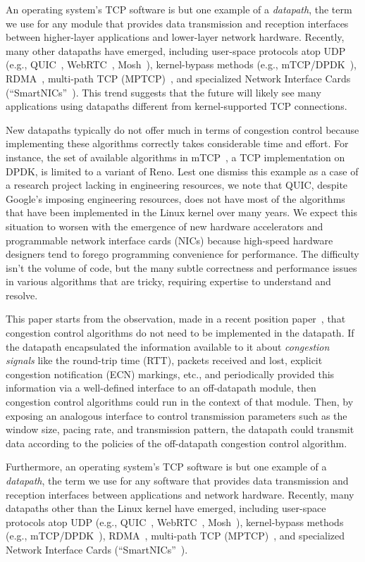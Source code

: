 An operating system's TCP software is but one example of a {\em datapath}, the term we use for any module that provides data transmission and reception interfaces between higher-layer applications and lower-layer network hardware. Recently, many other datapaths have emerged, including user-space protocols atop UDP (e.g., QUIC~\cite{quic}, WebRTC~\cite{webrtc}, Mosh~\cite{mosh}), kernel-bypass methods (e.g., mTCP/DPDK~\cite{dpdk,mtcp,netmap}), RDMA~\cite{dcqcn}, multi-path TCP (MPTCP)~\cite{mptcp}, and specialized Network Interface Cards (``SmartNICs''~\cite{smartnic}). This trend suggests that the future will likely see many applications using datapaths different from kernel-supported TCP connections.

New datapaths typically do not offer much in terms of congestion control because implementing these algorithms correctly takes considerable time and effort. For instance, the set of available algorithms in mTCP~\cite{mtcp}, a TCP implementation on DPDK, is limited to a variant of Reno. Lest one dismiss this example as a case of a research project lacking in engineering resources, we note that QUIC, despite Google's imposing engineering resources, does not have most of the algorithms that have been implemented in the Linux kernel over many years.  We expect this situation to worsen with the emergence of new hardware accelerators and programmable network interface cards (NICs) because high-speed hardware designers tend to forego programming convenience for performance. The difficulty isn't the volume of code, but the many subtle correctness and performance issues in various algorithms that are tricky, requiring expertise to understand and resolve.

This paper starts from the observation, made in a recent position paper~\cite{ccp-hotnets}, that congestion control algorithms do not need to be implemented in the datapath. If the datapath encapsulated the information available to it about {\em congestion signals} like the round-trip time (RTT), packets received and lost, explicit congestion notification (ECN) markings, etc., and periodically provided this information via a well-defined interface to an off-datapath module, then congestion control algorithms could run in the context of that module. Then, by exposing an analogous interface to control transmission parameters such as the window size, pacing rate, and transmission pattern, the datapath could transmit data according to the policies of the off-datapath congestion control algorithm. 

Furthermore, an operating system's TCP software is but one example of a {\em
  datapath}, the term we use for any software that provides data transmission
and reception interfaces between applications and network hardware.
%
Recently, many datapaths other than the Linux kernel have emerged, including
user-space protocols atop UDP (e.g., QUIC~\cite{quic}, WebRTC~\cite{webrtc},
Mosh~\cite{mosh}), kernel-bypass methods (e.g.,
mTCP/DPDK~\cite{dpdk,mtcp,netmap}), RDMA~\cite{dcqcn}, multi-path TCP
(MPTCP)~\cite{mptcp}, and specialized Network Interface Cards
(``SmartNICs''~\cite{smartnic}).

